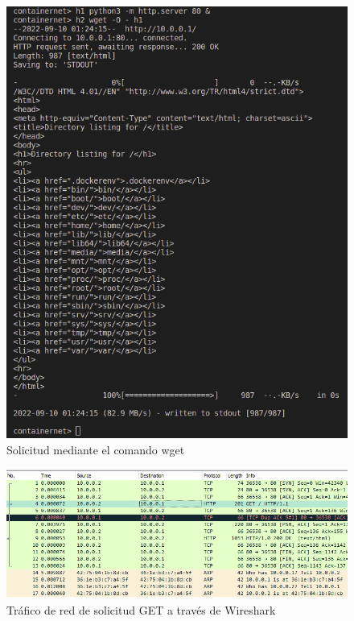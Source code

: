 \documentclass[10pt]{article}
\begin{document}
\begin{multicols}{2}
\begin{figure}[H]
    \centering
    \includegraphics[width=\linewidth]{Imagenes/item02_GET_TERMINAL.png}
    \caption{Solicitud mediante el comando wget}
    \label{fig:item02_wget_terminal}
\end{figure}

\end{multicols}

\begin{figure}[H]
    \centering
    \includegraphics[width=\linewidth]{Imagenes/item02_GET.png}
    \caption{Tráfico de red de solicitud GET a través de Wireshark}
    \label{fig:item02_wget_wireshark}
\end{figure}
\end{document}
